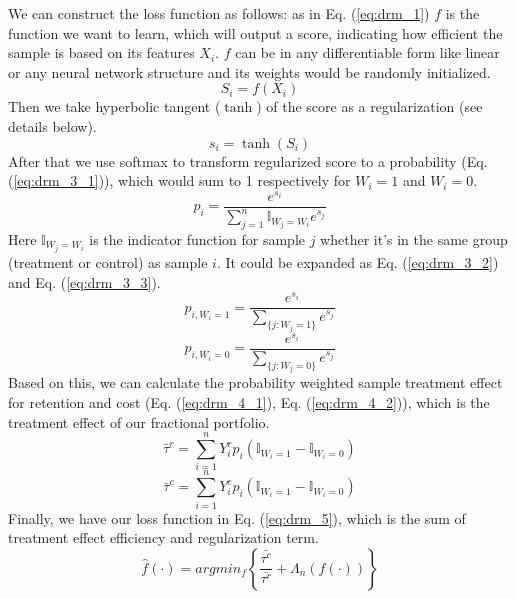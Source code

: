 We can construct the loss function as follows: as in Eq. (\ref{eq:drm_1}) $f$ is the function we want to learn, which will output a score, indicating how efficient the sample is based on its features $X_i$. $f$ can be in any differentiable form like linear or any neural network structure and its weights would be randomly initialized. 
\begin{equation}
  \label{eq:drm_1}
  S_i = f(X_i)
\end{equation}
Then we take hyperbolic tangent ($\tanh$) of the score as a regularization (see details below). 
\begin{equation}
  \label{eq:drm_2}
  s_i = \tanh(S_i)
\end{equation}
After that we use softmax to transform regularized score to a probability (Eq. (\ref{eq:drm_3_1})), which would sum to 1 respectively for $W_i=1$ and $W_i=0$. 
\begin{equation}
  \label{eq:drm_3_1}
  p_i = \frac{e^{s_i}}{\sum_{j=1}^n\mathbb{I}_{W_j=W_i}e^{s_j}}
\end{equation}
Here $\mathbb{I}_{W_j=W_i}$ is the indicator function for sample $j$ whether it's in the same group (treatment or control) as sample $i$. It could be expanded as Eq. (\ref{eq:drm_3_2}) and Eq. (\ref{eq:drm_3_3}).
\begin{equation}
  \label{eq:drm_3_2}
  p_{i, W_i=1} = \frac{e^{s_i}}{\sum_{\{j:W_j=1\}}e^{s_j}}
\end{equation}
\begin{equation}
  \label{eq:drm_3_3}
  p_{i, W_i=0} = \frac{e^{s_i}}{\sum_{\{j:W_j=0\}}e^{s_j}}
\end{equation}
Based on this, we can calculate the probability weighted sample treatment effect for retention and cost (Eq. (\ref{eq:drm_4_1}), Eq. (\ref{eq:drm_4_2})), which is the treatment effect of our fractional portfolio.
\begin{equation}
  \label{eq:drm_4_1}
  \bar\tau^r=\sum_{i=1}^nY^r_ip_i(\mathbb{I}_{W_i=1} - \mathbb{I}_{W_i=0})
\end{equation}
\begin{equation}
  \label{eq:drm_4_2}
  \bar\tau^c=\sum_{i=1}^nY^c_ip_i(\mathbb{I}_{W_i=1} - \mathbb{I}_{W_i=0})
\end{equation}
Finally, we have our loss function in Eq. (\ref{eq:drm_5}), which is the sum of treatment effect efficiency and regularization term.
\begin{equation}
  \label{eq:drm_5}
  \hat{f}(\cdot ) = argmin_{f}\left \{ \frac{\bar{\tau^c}}{\bar{\tau^r}}+\Lambda_n(f(\cdot ))  \right \}
\end{equation}

